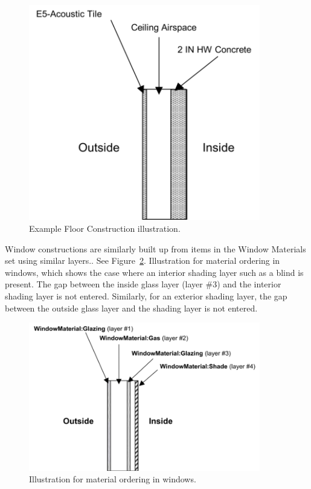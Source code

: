 \begin{figure}[hbtp] %
\centering
\includegraphics[width=0.9\textwidth, height=0.9\textheight, keepaspectratio=true]{media/image050.png}
\caption{Example Floor Construction illustration. \protect \label{fig:example-floor-construction-illustration.}}
\end{figure}

Window constructions are similarly built up from items in the Window Materials set using similar layers.. See Figure~\ref{fig:illustration-for-material-ordering-in}. Illustration for material ordering in windows, which shows the case where an interior shading layer such as a blind is present. The gap between the inside glass layer (layer \#3) and the interior shading layer is not entered. Similarly, for an exterior shading layer, the gap between the outside glass layer and the shading layer is not entered.

\begin{figure}[hbtp] %
\centering
\includegraphics[width=0.9\textwidth, height=0.9\textheight, keepaspectratio=true]{media/image051.png}
\caption{Illustration for material ordering in windows. \protect \label{fig:illustration-for-material-ordering-in}}
\end{figure}

